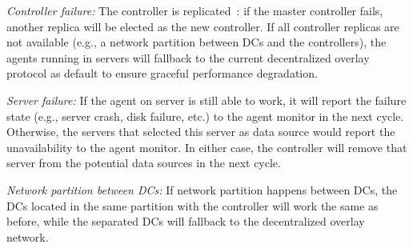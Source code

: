 \begin{packedenumerate}
\item \emph{Controller failure:} The controller is
replicated~\cite{lamport1998part}: if the master controller fails,
another replica will be elected as the new controller. If all
controller replicas are not available (e.g., a network partition
between DCs and the controllers), the agents running in servers will
fallback to the current decentralized overlay protocol as default to
ensure graceful performance degradation.
\item \emph{Server failure:} If the agent on server is still able to
work, it will report the failure state (e.g., server crash, disk
failure, etc.) to the agent monitor in the next cycle. Otherwise, the
servers that selected this server as data source would report the
unavailability to the agent monitor. In either case, the controller
will remove that server from the potential data sources in the next
cycle.
\item \emph{Network partition between DCs:}
If network partition happens between DCs, the DCs located in the same
partition with the controller will work the same as before, while the
separated DCs will fallback to the decentralized overlay network.
\end{packedenumerate}



